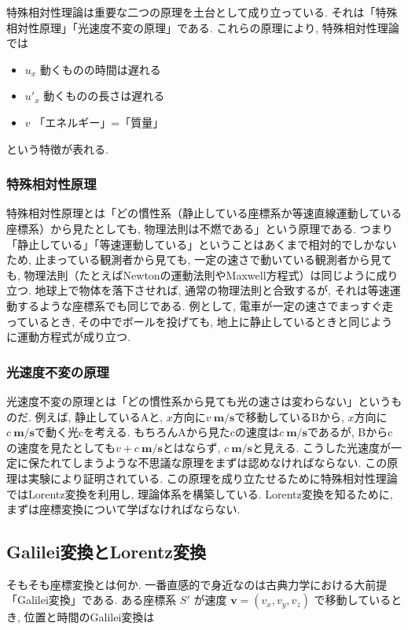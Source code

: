 \documentclass{ltjsarticle}
\begin{document}
特殊相対性理論は重要な二つの原理を土台として成り立っている. 
それは「特殊相対性原理」「光速度不変の原理」である. 
これらの原理により, 特殊相対性理論では
\begin{itemize}
    \item $u_x$ 動くものの時間は遅れる
    \item $u'_x$ 動くものの長さは遅れる
    \item $v$ 「エネルギー」=「質量」
\end{itemize}
という特徴が表れる. 

\subsubsection{特殊相対性原理}
特殊相対性原理とは「どの慣性系（静止している座標系か等速直線運動している座標系）から見たとしても, 物理法則は不燃である」という原理である. 
つまり「静止している」「等速運動している」ということはあくまで相対的でしかないため, 
止まっている観測者から見ても, 一定の速さで動いている観測者から見ても, 物理法則（たとえばNewtonの運動法則やMaxwell方程式）は同じように成り立つ. 
地球上で物体を落下させれば, 通常の物理法則と合致するが, それは等速運動するような座標系でも同じである. 
例として, 電車が一定の速さでまっすぐ走っているとき, その中でボールを投げても, 地上に静止しているときと同じように運動方程式が成り立つ. 

\subsubsection{光速度不変の原理}
光速度不変の原理とは「どの慣性系から見ても光の速さは変わらない」というものだ. 
例えば, 静止しているAと, $x$方向に$v~\mathbf{m/s}$で移動しているBから, $x$方向に$c~\mathbf{m/s}$で動く光cを考える. 
もちろんAから見たcの速度は$c~\mathbf{m/s}$であるが, Bからcの速度を見たとしても$v + c ~\mathbf{m/s}$とはならず, $c~\mathbf{m/s}$と見える. 
こうした光速度が一定に保たれてしまうような不思議な原理をまずは認めなければならない. この原理は実験により証明されている. 
この原理を成り立たせるために特殊相対性理論ではLorentz変換を利用し, 理論体系を構築している. 
Lorentz変換を知るために, まずは座標変換について学ばなければならない. 

\subsection{Galilei変換とLorentz変換}
そもそも座標変換とは何か. 
一番直感的で身近なのは古典力学における大前提「Galilei変換」である. 
ある座標系 \(S'\) が速度 \(\mathbf{v} = (v_x, v_y, v_z)\) で移動しているとき, 
位置と時間のGalilei変換は
\end{document}
